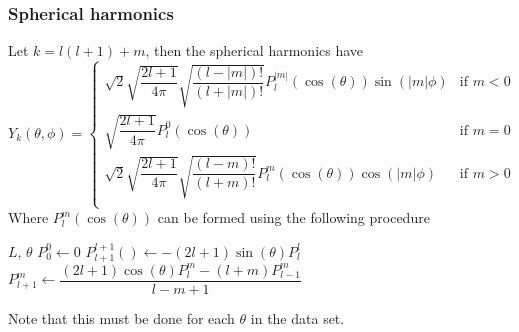 \documentclass[12pt,a4paper]{article}
\begin{document}
\subsubsection{Spherical harmonics}
Let $k = l (l+1) + m$, then the spherical harmonics have
\[
    Y_k(\theta, \phi) = 
    \begin{cases}
        \sqrt{2} \sqrt{\dfrac{2l+1}{4 \pi}} \sqrt{\dfrac{(l-|m|)!}{(l+|m|)!}} P^{|m|}_l \left(\cos(\theta)\right) \sin(|m|\phi) & \text{if } m < 0\\
        \sqrt{\dfrac{2l+1}{4 \pi}} P^{0}_l \left(\cos(\theta)\right) & \text{if } m = 0\\
        \sqrt{2} \sqrt{\dfrac{2l+1}{4 \pi}} \sqrt{\dfrac{(l-m)!}{(l+m)!}} P^{m}_l \left(\cos(\theta)\right) \cos(|m|\phi) & \text{if } m > 0\\
    \end{cases}
\]
Where $P^m_l \left(\cos(\theta) \right)$ can be formed using the following procedure
\begin{algorithmic}
    \Require $L$, $\theta$
    \State $P_0^0 \gets 0$
        \State $P_{l+1}^{l+1}() \gets -(2l+1)\sin(\theta)P_l^l$
            $P_{l+1}^m \gets \dfrac{(2l+1)\cos(\theta)P_l^m - (l+m)P_{l-1}^m}{l-m+1}$
        \EndFor
    \EndFor
\end{algorithmic}
Note that this must be done for each $\theta$ in the data set.
\end{document}
